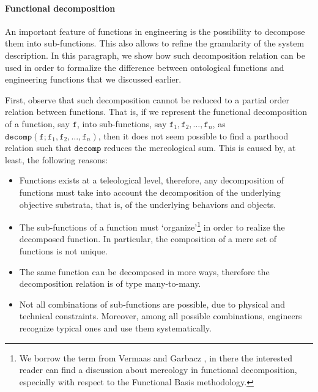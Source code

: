 \documentclass[sw]{iosart2x}
\newcommand{\generalStyle}[1]{\texttt{#1}}
\newcommand{\cst}[1]{\ensuremath{\mathtt{#1}}}
\newcommand{\decom}{\generalStyle{decomp}}
\newcommand{\TODO}[1]{{\color{red} #1}}
\begin{document}
\paragraph{Functional decomposition}
An important feature of functions in engineering is the possibility to decompose them into sub-functions. This also allows to refine the granularity of the system description. In this paragraph, we show how such decomposition relation can be used in order to formalize the difference between ontological functions and engineering functions that we discussed earlier.

First, observe that such decomposition cannot be reduced to a partial order relation between functions. %
That is, if we represent the functional decomposition of a function, say $\cst{f}$, into sub-functions, say $\cst{f}_1, \cst{f}_2, \dots, \cst{f}_n$, as $\decom(\cst{f};\cst{f}_1,\cst{f}_2,\dots,\cst{f}_n)$, then it does not seem possible to find a parthood relation such that $\decom$ reduces the mereological sum.
This is caused by, at least, the following reasons:
\begin{itemize}
  \item Functions exists at a teleological level, therefore, any decomposition of functions must take into account the decomposition of the underlying objective substrata, that is, of the underlying behaviors and objects.
  \item The sub-functions of a function must `organize'\footnote{We borrow the term from Vermaas and Garbacz \cite{vermaasFunctionalDecompositionMereology2009a}, in there the interested reader can find a discussion about mereology in functional decomposition, especially with respect to the Functional Basis methodology.} in order to realize the decomposed function. In particular, the composition of a mere set of functions is not unique.
  \item The same function can be decomposed in more ways, therefore the decomposition relation is of type many-to-many.
  \item Not all combinations of sub-functions are possible, due to physical and technical constraints. 
  Moreover, among all possible combinations, engineers recognize typical ones and use them systematically. 
\end{itemize}
\end{document}
